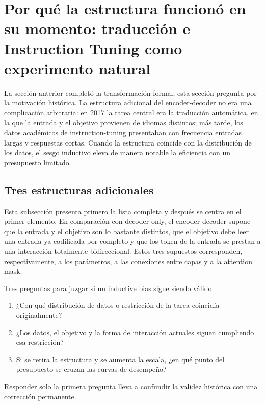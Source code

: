 \section{Por qué la estructura funcionó en su momento: traducción e Instruction Tuning como experimento natural}

La sección anterior completó la transformación formal; esta sección pregunta por la motivación histórica. La estructura adicional del encoder-decoder no era una complicación arbitraria: en 2017 la tarea central era la traducción automática, en la que la entrada y el objetivo provienen de idiomas distintos; más tarde, los datos académicos de instruction-tuning presentaban con frecuencia entradas largas y respuestas cortas. Cuando la estructura coincide con la distribución de los datos, el sesgo inductivo eleva de manera notable la eficiencia con un presupuesto limitado.

\subsection{Tres estructuras adicionales}

Esta subsección presenta primero la lista completa y después se centra en el primer elemento. En comparación con decoder-only, el encoder-decoder supone que la entrada y el objetivo son lo bastante distintos, que el objetivo debe leer una entrada ya codificada por completo y que los token de la entrada se prestan a una interacción totalmente bidireccional. Estos tres supuestos corresponden, respectivamente, a los parámetros, a las conexiones entre capas y a la attention mask.



\begin{importantbox}{Tres preguntas para juzgar si un inductive bias sigue siendo válido}
\begin{enumerate}
  \item ¿Con qué distribución de datos o restricción de la tarea coincidía originalmente?
  \item ¿Los datos, el objetivo y la forma de interacción actuales siguen cumpliendo esa restricción?
  \item Si se retira la estructura y se aumenta la escala, ¿en qué punto del presupuesto se cruzan las curvas de desempeño?
\end{enumerate}
Responder solo la primera pregunta lleva a confundir la validez histórica con una corrección permanente.
\end{importantbox}

